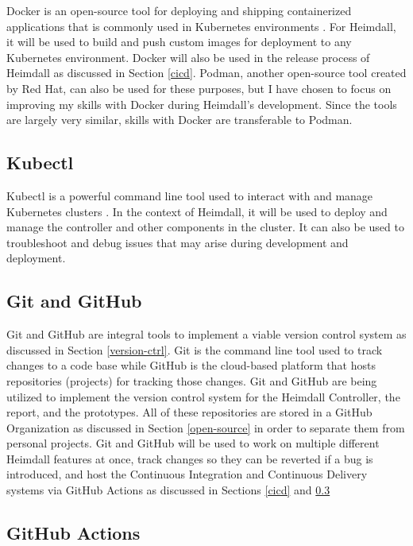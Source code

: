 \documentclass{article}
\begin{document}
Docker is an open-source tool for deploying and shipping containerized applications that is commonly used in Kubernetes environments \cite{docker-overview}. For Heimdall, it will be used to build and push custom images for deployment to any Kubernetes environment. Docker will also be used in the release process of Heimdall as discussed in Section \ref{cicd}. Podman, another open-source tool created by Red Hat, can also be used for these purposes, but I have chosen to focus on improving my skills with Docker during Heimdall's development. Since the tools are largely very similar, skills with Docker are transferable to Podman.

\subsection{Kubectl}

Kubectl is a powerful command line tool used to interact with and manage Kubernetes clusters \cite{k8s-tools}. In the context of Heimdall, it will be used to deploy and manage the controller and other components in the cluster. It can also be used to troubleshoot and debug issues that may arise during development and deployment.


\subsection{Git and GitHub}

Git and GitHub are integral tools to implement a viable version control system as discussed in Section \ref{version-ctrl}. Git is the command line tool used to track changes to a code base while GitHub is the cloud-based platform that hosts repositories (projects) for tracking those changes. Git and GitHub are being utilized to implement the version control system for the Heimdall Controller, the report, and the prototypes. All of these repositories are stored in a GitHub Organization as discussed in Section \ref{open-source} in order to separate them from personal projects. Git and GitHub will be used to work on multiple different Heimdall features at once, track changes so they can be reverted if a bug is introduced, and host the Continuous Integration and Continuous Delivery systems via GitHub Actions as discussed in Sections \ref{cicd} and \ref{gha}


\subsection{GitHub Actions} \label{gha}
\end{document}
